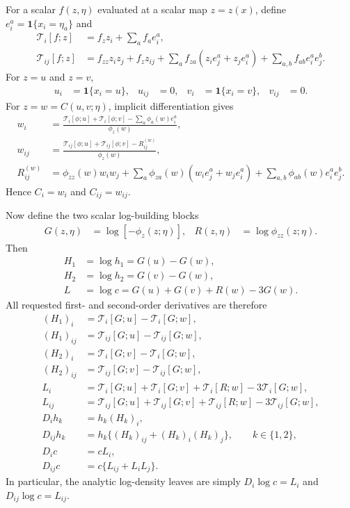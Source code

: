 \documentclass[10pt]{article}
\newcommand{\ind}{\mathbf{1}}
\newcommand{\T}{\mathcal{T}}
\begin{document}
For a scalar $f(z,\eta)$ evaluated at a scalar map $z=z(x)$, define
$e_i^a=\ind\{x_i=\eta_a\}$ and
\begin{align*}
\T_i[f;z]
&=f_z z_i+\sum_a f_a e_i^a,\\
\T_{ij}[f;z]
&=f_{zz}z_i z_j+f_z z_{ij}
 +\sum_a f_{za}(z_i e_j^a+z_j e_i^a)
 +\sum_{a,b}f_{ab}e_i^a e_j^b.
\end{align*}
For $z=u$ and $z=v$,
\begin{align*}
u_i&=\ind\{x_i=u\},&u_{ij}&=0,
&v_i&=\ind\{x_i=v\},&v_{ij}&=0.
\end{align*}
For $z=w=C(u,v;\eta)$, implicit differentiation gives
\begin{align*}
w_i
&=\frac{\T_i[\phi;u]+\T_i[\phi;v]-\sum_a\phi_a(w)e_i^a}
        {\phi_z(w)},\\
w_{ij}
&=\frac{\T_{ij}[\phi;u]+\T_{ij}[\phi;v]-R_{ij}^{(w)}}
        {\phi_z(w)},\\
R_{ij}^{(w)}
&=\phi_{zz}(w)w_iw_j
 +\sum_a\phi_{za}(w)(w_i e_j^a+w_j e_i^a)
 +\sum_{a,b}\phi_{ab}(w)e_i^a e_j^b.
\end{align*}
Hence $C_i=w_i$ and $C_{ij}=w_{ij}$.

Now define the two scalar log-building blocks
\begin{align*}
G(z,\eta)&=\log[-\phi_z(z;\eta)],
&
R(z,\eta)&=\log \phi_{zz}(z;\eta).
\end{align*}
Then
\begin{align*}
H_1&=\log h_1=G(u)-G(w),\\
H_2&=\log h_2=G(v)-G(w),\\
L&=\log c=G(u)+G(v)+R(w)-3G(w).
\end{align*}
All requested first- and second-order derivatives are therefore
\begin{align*}
(H_1)_i
&=\T_i[G;u]-\T_i[G;w],\\
(H_1)_{ij}
&=\T_{ij}[G;u]-\T_{ij}[G;w],\\
(H_2)_i
&=\T_i[G;v]-\T_i[G;w],\\
(H_2)_{ij}
&=\T_{ij}[G;v]-\T_{ij}[G;w],\\
L_i
&=\T_i[G;u]+\T_i[G;v]+\T_i[R;w]-3\T_i[G;w],\\
L_{ij}
&=\T_{ij}[G;u]+\T_{ij}[G;v]+\T_{ij}[R;w]-3\T_{ij}[G;w],\\
D_i h_k
&=h_k(H_k)_i,\\
D_{ij}h_k
&=h_k\{(H_k)_{ij}+(H_k)_i(H_k)_j\},\qquad k\in\{1,2\},\\
D_i c
&=cL_i,\\
D_{ij}c
&=c\{L_{ij}+L_iL_j\}.
\end{align*}
In particular, the analytic log-density leaves are simply
$D_i\log c=L_i$ and $D_{ij}\log c=L_{ij}$.
\end{document}
